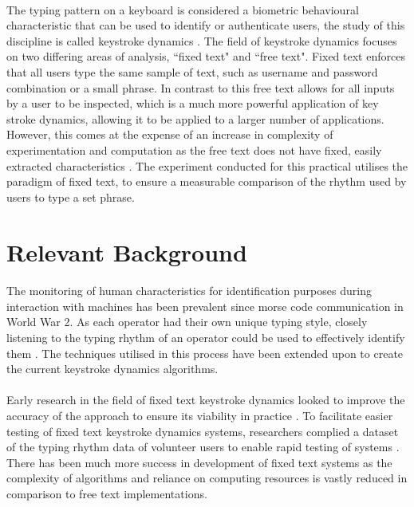 \documentclass{article}
\begin{document}
\paragraph{}
The typing pattern on a keyboard is considered a biometric behavioural characteristic that can be used to identify or authenticate users, the study of this discipline is called keystroke dynamics \parencite{keyStrokeDynamics}. The field of keystroke dynamics focuses on two differing areas of analysis, ``fixed text" and ``free text". Fixed text enforces that all users type the same sample of text, such as username and password combination or a small phrase. In contrast to this free text allows for all inputs by a user to be inspected, which is a much more powerful application of key stroke dynamics, allowing it to be applied to a larger number of applications. However, this comes at the expense of an increase in complexity of experimentation and computation as the free text does not have fixed, easily extracted characteristics \parencite{sznur2015advances}. The experiment conducted for this practical utilises the paradigm of fixed text, to ensure a measurable comparison of the rhythm used by users to type a set phrase. 

\section{Relevant Background} \label{background}
\paragraph{}
The monitoring of human characteristics for identification purposes during interaction with machines has been prevalent since morse code communication in World War 2. As each operator had their own unique typing style, closely listening to the typing rhythm of an operator could be used to effectively identify them \parencite{sznur2015advances}. The techniques utilised in this process have been extended upon to create the current keystroke dynamics algorithms. 

\paragraph{}
Early research in the field of fixed text keystroke dynamics looked to improve the accuracy of the approach to ensure its viability in practice \parencite{Bergadano:2002}. To facilitate easier testing of fixed text keystroke dynamics systems, researchers complied a dataset of the typing rhythm data
of volunteer users to enable rapid testing of systems \parencite{bello2010collection}. There has been much more success in development of fixed text systems as the complexity of algorithms and reliance on computing resources is vastly reduced in comparison to free text implementations. 
\end{document}
